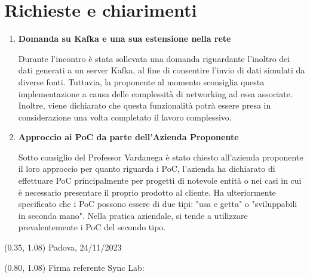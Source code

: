 \documentclass{article}
\begin{document}
\section{Richieste e chiarimenti}
\begin{enumerate}
    \item \textbf{Domanda su Kafka e una sua estensione nella rete}
    
    Durante l'incontro è stata sollevata una domanda riguardante l'inoltro dei dati generati a un server Kafka, al fine di consentire l'invio di dati simulati da diverse fonti. Tuttavia, la proponente al momento sconsiglia questa implementazione a causa delle complessità di networking ad essa associate. 
    Inoltre, viene dichiarato che questa funzionalità potrà essere presa in considerazione una volta completato il lavoro complessivo.
    \item \textbf{Approccio ai PoC da parte dell'Azienda Proponente}
    
    Sotto consiglio del Professor Vardanega è stato chiesto all'azienda proponente il loro approccio per quanto riguarda i PoC, l'azienda ha dichiarato di effettuare PoC principalmente per progetti di notevole entità o nei casi in cui è necessario presentare il proprio prodotto al cliente. Ha ulteriormente specificato che i PoC possono essere di due tipi: "usa e getta" o "sviluppabili in seconda mano". Nella pratica aziendale, si tende a utilizzare prevalentemente i PoC del secondo tipo.
\end{enumerate}
    
    
    
\begin{textblock*}{\textwidth}(0.35\textwidth, 1.08\textheight)
    Padova, 24/11/2023
\end{textblock*}

\begin{textblock*}{\textwidth}(0.80\textwidth, 1.08\textheight)
        Firma referente Sync Lab:
\end{textblock*}
\end{document}
